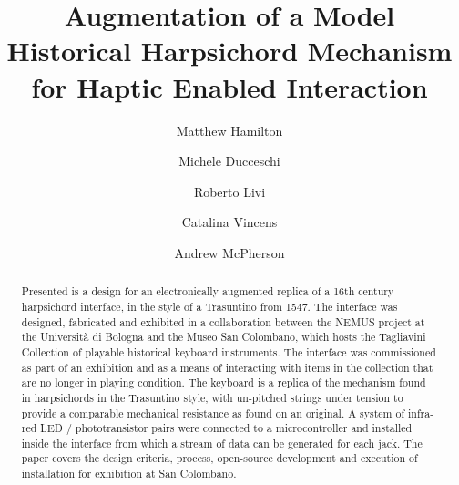 \documentclass[sigconf]{nimeart}
\begin{document}
\title{Augmentation of a Model Historical Harpsichord Mechanism for Haptic Enabled Interaction}

\author{Matthew Hamilton}
\author{Michele Ducceschi}

\author{Roberto Livi}
\author{Catalina Vincens}

\author{Andrew McPherson}

\renewcommand{\shortauthors}{Trovato et al.}

\begin{abstract}
Presented is a design for an electronically augmented replica of a 16th century
harpsichord interface, in the style of a Trasuntino from 1547. The interface was
designed, fabricated and exhibited in a collaboration between the NEMUS project
at the Università di Bologna and the Museo San Colombano, which hosts the
Tagliavini Collection of playable historical keyboard instruments. The interface
was commissioned as part of an exhibition and as a means of interacting with
items in the collection that are no longer in playing condition. The keyboard is
a replica of the mechanism found in harpsichords in the Trasuntino style, with
un-pitched strings under tension to provide a comparable mechanical resistance
as found on an original. A system of infra-red LED / phototransistor pairs were
connected to a microcontroller and installed inside the interface from which a
stream of data can be generated for each jack. The paper covers the design
criteria, process, open-source development and execution of installation for
exhibition at San Colombano.
\end{abstract}
\end{document}
